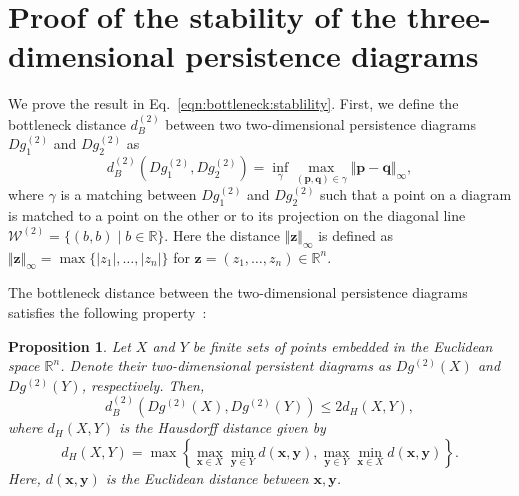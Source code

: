 \documentclass[twocolumn,pre,amsmath,amssymb]{revtex4-1}
\newtheorem{proposition}{Proposition}
\newcommand{\bx}{\ensuremath{\boldsymbol{x}}}
\newcommand{\by}{\ensuremath{\boldsymbol{y}}}
\newcommand{\bp}{\ensuremath{\boldsymbol{p}}}
\newcommand{\bq}{\ensuremath{\boldsymbol{q}}}
\begin{document}
\section{Proof of the stability of the three-dimensional persistence diagrams\label{sec:appx:stab}}
\renewcommand{\theproposition}{A\arabic{proposition}}
		We prove the result in Eq.~\eqref{eqn:bottleneck:stablility}. 
		First, we define the bottleneck distance $d^{(2)}_B$ between two two-dimensional persistence diagrams $Dg_1^{(2)}$ and $Dg_2^{(2)}$ as
		\begin{equation}\label{eqn:bottleneck2:def}
	d^{(2)}_B(Dg_{1}^{(2)},Dg_{2}^{(2)}) = \inf_{\gamma} \max_{(\bp,\bq) \in \gamma} \Vert \bp - \bq\Vert_{\infty},
	\end{equation} 
	where $\gamma$ is a matching between $Dg_1^{(2)}$ and $Dg_2^{(2)}$
    such that a point on a diagram is matched to a point on the other or to its projection on the diagonal line $\mathcal{W}^{(2)} = \{(b, b) \mid b \in \mathbb{R}\}$. 
    Here the distance $\Vert \boldsymbol{z} \Vert_{\infty}$ is defined as $\Vert \boldsymbol{z} \Vert_{\infty}=\max\{|z_1|,\ldots, |z_n|\}$ for $\boldsymbol{z} = (z_1,\ldots, z_n) \in \mathbb{R}^n$.
	
    The bottleneck distance between the two-dimensional persistence diagrams satisfies the following property~\cite{chazal:stability:2014}: 
	
	\begin{proposition}
		Let $X$ and $Y$ be finite sets of points embedded in the Euclidean space $\mathbb{R}^n$. Denote their two-dimensional persistent diagrams as $Dg^{(2)}(X)$ and $Dg^{(2)}(Y)$, respectively. Then,
		\begin{equation}
		d^{(2)}_B(Dg^{(2)}(X), Dg^{(2)}(Y)) \leq 2d_H(X, Y),
		\end{equation}
		where $d_H(X, Y)$ is the Hausdorff distance given by 
		\begin{equation}
		 d_H(X, Y) = \max \left\{ \max_{\bx\in X} \min_{\by \in Y} d(\bx, \by),  \max_{\by \in Y} \min_{\bx \in X}d(\bx, \by)\right\}\nonumber.
		\end{equation}
		Here, $d(\bx, \by)$ is the Euclidean distance between $\bx, \by$.
	\end{proposition}
	
\end{document}
